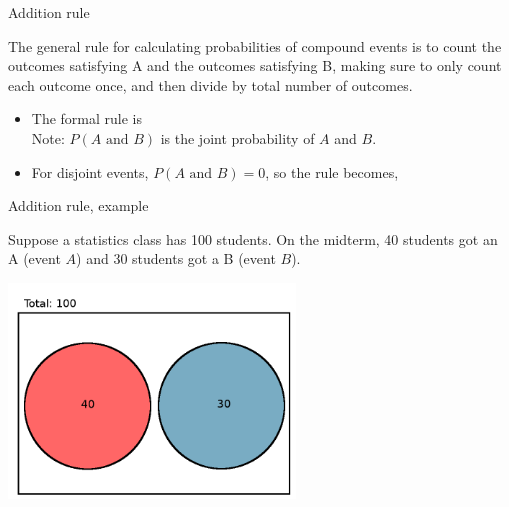\documentclass[xcolor=table, aspectratio=169, bigger, handout]{beamer}
\begin{document}
\begin{frame}{Addition rule}
\begin{block}{}
The general rule for calculating probabilities of compound events is to count the outcomes satisfying A and the outcomes satisfying B, making sure to only count each outcome once, and then divide by total number of outcomes.
\end{block}

\pause
\begin{block}{}
\begin{itemize}
\item The formal rule is\\
\smallskip{}
\medskip Note: $P(A \text{ and } B)$ is the joint probability of $A$ and $B$.

\pause\medskip
\item For disjoint events, $P(A \text{ and } B) = 0$, so the rule becomes,\\
\smallskip{}
\end{itemize}
\end{block}
\end{frame}

\begin{frame}{Addition rule, example}
\begin{block}{}
Suppose a statistics class has 100 students. On the midterm, 40 students got an A (event $A$) and 30 students got a B (event $B$).
\end{block}

{\centering
\includegraphics[width=3in]{../images/ch4_venn_dsj_ex}\par
}
\end{frame}
\end{document}
